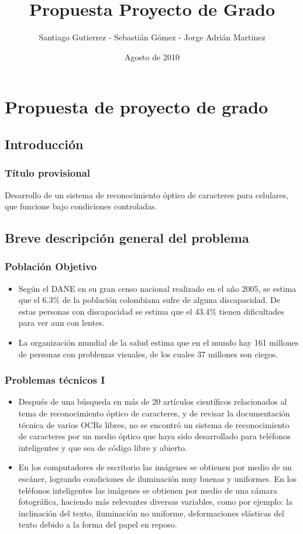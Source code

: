 \documentclass{beamer}
\title {Propuesta Proyecto de Grado}
\author { Santiago Gutierrez - Sebastián Gómez - Jorge Adrián Martinez }
\date {Agosto de 2010}
\begin{document}
	
	\frame{\titlepage}
	
	\frame{\tableofcontents}
	
	\section{Propuesta de proyecto de grado}
	\subsection{Introducción}
	\begin{frame}
		\frametitle{Título provisional}
		Desarrollo de un sistema de reconocimiento óptico de caracteres para
		celulares, que funcione bajo condiciones controladas.
	\end{frame}
	
	\subsection{Breve descripción general del problema}
	\begin{frame}
	\frametitle{Población Objetivo}
	\begin{itemize}
		\pause
		\item Según el DANE en su gran censo nacional realizado en el año 2005, se estima que el 6.3\% de la población colombiana sufre de alguna discapacidad. De estas personas con discapacidad se estima que el 43.4\% tienen dificultades para ver aun con lentes.
		\pause
		\item La organización mundial de la salud estima que en el mundo hay 161 millones de personas con problemas visuales, de los cuales 37 millones son ciegos.
	\end{itemize}
	\end{frame}
	
	\begin{frame}
	\frametitle{Problemas técnicos I}
	\begin{itemize}
		\pause
		\item Después de una búsqueda en más de 20 artículos científicos relacionados al tema de reconocimiento óptico de caracteres, y de revisar la documentación técnica de varios OCRs libres, no se encontró un sistema de reconocimiento de caracteres por un medio óptico que haya sido desarrollado para teléfonos inteligentes y que sea de código libre y abierto.
		\pause
		\item En los computadores de escritorio las imágenes se obtienen por medio de un escáner, logrando condiciones de iluminación muy buenas y uniformes. En los teléfonos inteligentes las imágenes se obtienen por medio de una cámara fotográfica, haciendo más relevantes diversas variables, como por ejemplo: la inclinación del texto, iluminación no uniforme, deformaciones elásticas del texto debido a la forma del papel en reposo.
	\end{itemize}
	\end{frame}
	
\end{document}
